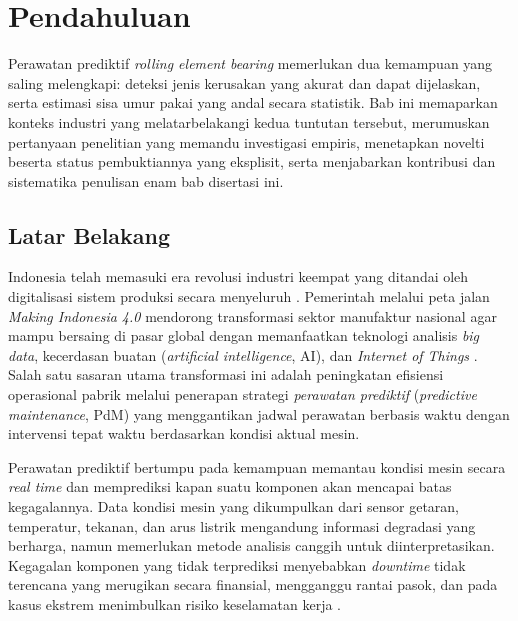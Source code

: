 ﻿%

\chapter{Pendahuluan}
\label{bab:pendahuluan}

Perawatan prediktif \emph{rolling element bearing} memerlukan dua kemampuan yang
saling melengkapi: deteksi jenis kerusakan yang akurat dan dapat
dijelaskan, serta estimasi sisa umur pakai yang andal secara statistik.
Bab ini memaparkan konteks industri yang melatarbelakangi kedua tuntutan
tersebut, merumuskan pertanyaan penelitian yang memandu investigasi
empiris, menetapkan novelti beserta status pembuktiannya yang eksplisit,
serta menjabarkan kontribusi dan sistematika penulisan enam bab
disertasi ini.

\section{Latar Belakang}
\label{sec:bab1_latar}

Indonesia telah memasuki era revolusi industri keempat yang ditandai oleh
digitalisasi sistem produksi secara menyeluruh .
Pemerintah melalui peta jalan \emph{Making Indonesia 4.0} mendorong
transformasi sektor manufaktur nasional agar mampu bersaing di pasar global
dengan memanfaatkan teknologi analisis \emph{big data}, kecerdasan buatan
(\emph{artificial intelligence}, AI), dan \emph{Internet of Things}
.
Salah satu sasaran utama transformasi ini adalah peningkatan efisiensi
operasional pabrik melalui penerapan strategi \emph{perawatan prediktif}
(\emph{predictive maintenance}, PdM) yang menggantikan jadwal perawatan
berbasis waktu dengan intervensi tepat waktu berdasarkan kondisi aktual
mesin.

Perawatan prediktif bertumpu pada kemampuan memantau kondisi mesin secara
\emph{real time} dan memprediksi kapan suatu komponen akan mencapai batas
kegagalannya.
Data kondisi mesin yang dikumpulkan dari sensor getaran, temperatur,
tekanan, dan arus listrik mengandung informasi degradasi yang berharga,
namun memerlukan metode analisis canggih untuk diinterpretasikan.
Kegagalan komponen yang tidak terprediksi menyebabkan \emph{downtime} tidak
terencana yang merugikan secara finansial, mengganggu rantai pasok, dan
pada kasus ekstrem menimbulkan risiko keselamatan kerja
.

